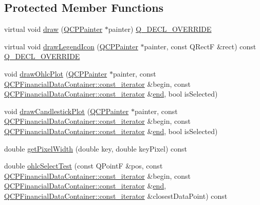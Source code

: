 \subsection*{Protected Member Functions}
\begin{DoxyCompactItemize}
\item 
virtual void \mbox{\hyperlink{class_q_c_p_financial_a4d62b7a618d609321adb5f5f1e31f446}{draw}} (\mbox{\hyperlink{class_q_c_p_painter}{Q\+C\+P\+Painter}} $\ast$painter) \mbox{\hyperlink{qcustomplot_8h_a42cc5eaeb25b85f8b52d2a4b94c56f55}{Q\+\_\+\+D\+E\+C\+L\+\_\+\+O\+V\+E\+R\+R\+I\+DE}}
\item 
virtual void \mbox{\hyperlink{class_q_c_p_financial_a53f6ef2cddb650993f04c66e39a04942}{draw\+Legend\+Icon}} (\mbox{\hyperlink{class_q_c_p_painter}{Q\+C\+P\+Painter}} $\ast$painter, const Q\+RectF \&rect) const \mbox{\hyperlink{qcustomplot_8h_a42cc5eaeb25b85f8b52d2a4b94c56f55}{Q\+\_\+\+D\+E\+C\+L\+\_\+\+O\+V\+E\+R\+R\+I\+DE}}
\item 
void \mbox{\hyperlink{class_q_c_p_financial_a2c77aab636f6bce6e0407b3f94e90d08}{draw\+Ohlc\+Plot}} (\mbox{\hyperlink{class_q_c_p_painter}{Q\+C\+P\+Painter}} $\ast$painter, const \mbox{\hyperlink{class_q_c_p_data_container_ae40a91f5cb0bcac61d727427449b7d15}{Q\+C\+P\+Financial\+Data\+Container\+::const\+\_\+iterator}} \&begin, const \mbox{\hyperlink{class_q_c_p_data_container_ae40a91f5cb0bcac61d727427449b7d15}{Q\+C\+P\+Financial\+Data\+Container\+::const\+\_\+iterator}} \&\mbox{\hyperlink{myutils_8h_a64d77caddefed4b96fa62e3f5f73c9a2}{end}}, bool is\+Selected)
\item 
void \mbox{\hyperlink{class_q_c_p_financial_ade6b703369d8acb3bfa0b8e244df4b06}{draw\+Candlestick\+Plot}} (\mbox{\hyperlink{class_q_c_p_painter}{Q\+C\+P\+Painter}} $\ast$painter, const \mbox{\hyperlink{class_q_c_p_data_container_ae40a91f5cb0bcac61d727427449b7d15}{Q\+C\+P\+Financial\+Data\+Container\+::const\+\_\+iterator}} \&begin, const \mbox{\hyperlink{class_q_c_p_data_container_ae40a91f5cb0bcac61d727427449b7d15}{Q\+C\+P\+Financial\+Data\+Container\+::const\+\_\+iterator}} \&\mbox{\hyperlink{myutils_8h_a64d77caddefed4b96fa62e3f5f73c9a2}{end}}, bool is\+Selected)
\item 
double \mbox{\hyperlink{class_q_c_p_financial_a3ff49384a95233140c8205af77c08955}{get\+Pixel\+Width}} (double key, double key\+Pixel) const
\item 
double \mbox{\hyperlink{class_q_c_p_financial_a2bf2228cc443eb5fb11ec3ea3902859c}{ohlc\+Select\+Test}} (const Q\+PointF \&pos, const \mbox{\hyperlink{class_q_c_p_data_container_ae40a91f5cb0bcac61d727427449b7d15}{Q\+C\+P\+Financial\+Data\+Container\+::const\+\_\+iterator}} \&begin, const \mbox{\hyperlink{class_q_c_p_data_container_ae40a91f5cb0bcac61d727427449b7d15}{Q\+C\+P\+Financial\+Data\+Container\+::const\+\_\+iterator}} \&\mbox{\hyperlink{myutils_8h_a64d77caddefed4b96fa62e3f5f73c9a2}{end}}, \mbox{\hyperlink{class_q_c_p_data_container_ae40a91f5cb0bcac61d727427449b7d15}{Q\+C\+P\+Financial\+Data\+Container\+::const\+\_\+iterator}} \&closest\+Data\+Point) const

\end{DoxyCompactItemize}

